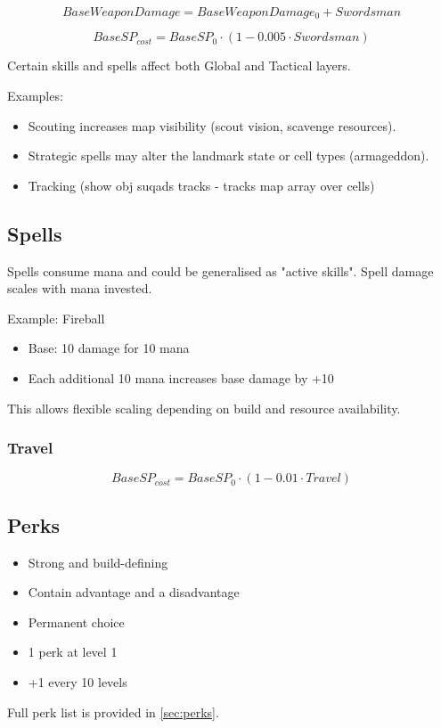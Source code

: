 \begin{equation}
BaseWeaponDamage = BaseWeaponDamage_0 + Swordsman
\end{equation}

\begin{equation}
BaseSP_{cost} = BaseSP_{0} \cdot (1 - 0.005 \cdot Swordsman)
\end{equation}

Certain skills and spells affect both Global and Tactical layers.

Examples:

\begin{itemize}
\item Scouting increases map visibility (scout vision, scavenge resources).
\item Strategic spells may alter the landmark state or cell types (armageddon).
\item Tracking (show obj suqads tracks - tracks map array over cells)
\end{itemize}


\subsection{Spells}

Spells consume mana and could be generalised as "active skills".
Spell damage scales with mana invested.

Example: Fireball

\begin{itemize}
\item Base: 10 damage for 10 mana
\item Each additional 10 mana increases base damage by +10
\end{itemize}

This allows flexible scaling depending on build and resource availability.


\subsubsection{Travel}

\begin{equation}
BaseSP_{cost} = BaseSP_{0} \cdot (1 - 0.01 \cdot Travel)
\end{equation}


\subsection{Perks}

\begin{itemize}
\item Strong and build-defining
\item Contain advantage and a disadvantage
\item Permanent choice
\item 1 perk at level 1
\item +1 every 10 levels
\end{itemize}

Full perk list is provided in \autoref{sec:perks}.







